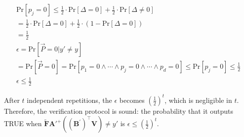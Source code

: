 \documentclass[11pt]{article}
\begin{document}
\begin{itemize}
    \[ \label{neqzero2}
    \begin{split}
        \text{Pr}[p_j=0] \leq \frac{1}{2} \cdot \text{Pr}[\Delta=0] + \frac{1}{2}\cdot \text{Pr}[\Delta\neq 0] \\
        = \frac{1}{2} \cdot \text{Pr}[\Delta=0] + \frac{1}
        {2}\cdot(1-\text{Pr}[\Delta=0])\\
        =\frac{1}{2} \\
        \epsilon=\text{Pr}[\vec{P}=0| y' \neq y] \\
        = \text{Pr}[\vec{P}=0]=\text{Pr}[p_1=0 \wedge \cdots \wedge p_j=0 \wedge \cdots \wedge p_d=0] \leq \text{Pr}[p_j=0] \leq \frac{1}{2}\\
        \epsilon \leq \frac{1}{2}
    \end{split}
    \]
\end{itemize}

After $t$ independent repetitions, the $\epsilon$ becomes $(\frac{1}{2})^t$, which is negligible in $t$. Therefore, the verification protocol is sound: the probability that it outputs TRUE when $\mathbf{\tilde F{A'}^+}((\mathbf{B}^{'})^\top \mathbf{V})\neq y'$ is $\epsilon \leq (\frac{1}{2})^t$.
\end{document}
